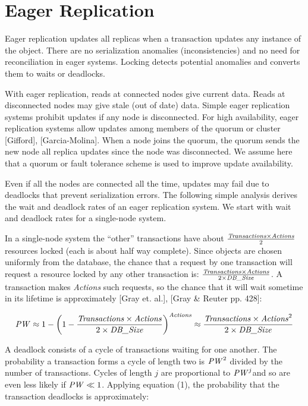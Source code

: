 \documentclass[a4paper,11pt,twoside,openright]{article}
\begin{document}
\section{Eager Replication}

Eager replication updates all replicas when a transaction updates any
instance of the object. There are no serialization anomalies
(inconsistencies) and no need for reconciliation in eager systems.
Locking detects potential anomalies and converts them to waits or
deadlocks.

With eager replication, reads at connected nodes give current data.
Reads at disconnected nodes may give stale (out of date) data. Simple
eager replication systems prohibit updates if any node is disconnected.
For high availability, eager replication systems allow updates among
members of the quorum or cluster {[}Gifford{]}, {[}Garcia-Molina{]}.
When a node joins the quorum, the quorum sends the new node all replica
updates since the node was disconnected. We assume here that a quorum or
fault tolerance scheme is used to improve update availability.

Even if all the nodes are connected all the time, updates may fail due
to deadlocks that prevent serialization errors. The following simple
analysis derives the wait and deadlock rates of an eager replication
system. We start with wait and deadlock rates for a single-node system.

In a single-node system the ``other'' transactions have about
\(\frac{\text{\emph{Transactions}} \times \text{\emph{Actions}}}{2}\) resources
locked (each is about half way complete). Since objects are chosen
uniformly from the database, the chance that a request by one
transaction will request a resource locked by any other transaction is:
\(\frac{\text{\emph{Transactions}} \times \text{\emph{Actions}}}{2 \times \text{\emph{DB\_Size}}}\).
A transaction makes \emph{Actions} such requests, so the chance that
it will wait sometime in its lifetime is approximately {[}Gray et.
al.{]}, {[}Gray \& Reuter pp. 428{]}:

\begin{equation}
  \text{\emph{PW}} \approx 1 - \left( 1 - \frac{\text{\emph{Transactions}} \times \text{\emph{Actions}}}{2 \times \text{\emph{DB\_Size}}} \right)^\text{\emph{Actions}}
     \approx \frac{\text{\emph{Transactions}} \times \text{\emph{Actions}}^2}{2 \times \text{\emph{DB\_Size}}}
\end{equation}

A deadlock consists of a cycle of transactions waiting for one another.
The probability a transaction forms a cycle of length two is
\(\text{\emph{PW}}^2\) divided by the number of transactions.
Cycles of length \(j\) are proportional to \(\text{\emph{PW}}^j\)and so are even less likely
if \(\text{\emph{PW}} \ll 1\).
Applying equation (1), the probability that the transaction deadlocks is
approximately:
\end{document}

